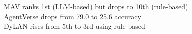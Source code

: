 \documentclass[preview]{standalone}
\begin{document}
MAV ranks 1st (LLM-based) but drops to 10th (rule-based)\\AgentVerse drops from 79.0 to 25.6 accuracy\\DyLAN rises from 5th to 3rd using rule-based\\
\end{document}

